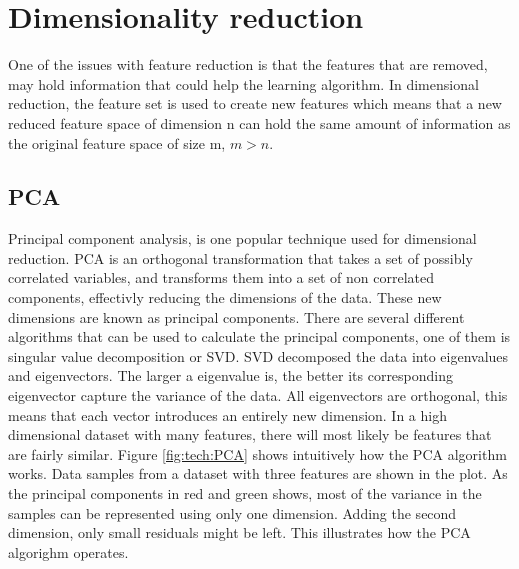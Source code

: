 \section{Dimensionality reduction}\label{sec:dim_red}
    One of the issues with feature reduction is that the features that are removed, may hold information that could help the learning algorithm. In dimensional reduction, the feature set is used to create new features which means that a new reduced feature space of dimension n can hold the same amount of information as the original feature space of size m, $m>n$.

    \subsection{PCA}\label{subsec:PCA}
        Principal component analysis, is one popular technique used for dimensional reduction. PCA is an orthogonal transformation that takes a set of possibly correlated variables, and transforms them into a set of non correlated components, effectivly reducing the dimensions of the data. These new dimensions are known as principal components. There are several different algorithms that can be used to calculate the principal components, one of them is singular value decomposition or SVD. SVD decomposed the data into eigenvalues and eigenvectors. The larger a eigenvalue is, the better its corresponding eigenvector capture the variance of the data. All eigenvectors are orthogonal, this means that each vector introduces an entirely new dimension. In a high dimensional dataset with many features, there will most likely be features that are fairly similar. Figure \ref{fig:tech:PCA} shows intuitively how the PCA algorithm works. Data samples from a dataset with three features are shown in the plot. As the principal components in red and green shows, most of the variance in the samples can be represented using only one dimension. Adding the second dimension, only small residuals might be left. This illustrates how the PCA algorighm operates. 
        
